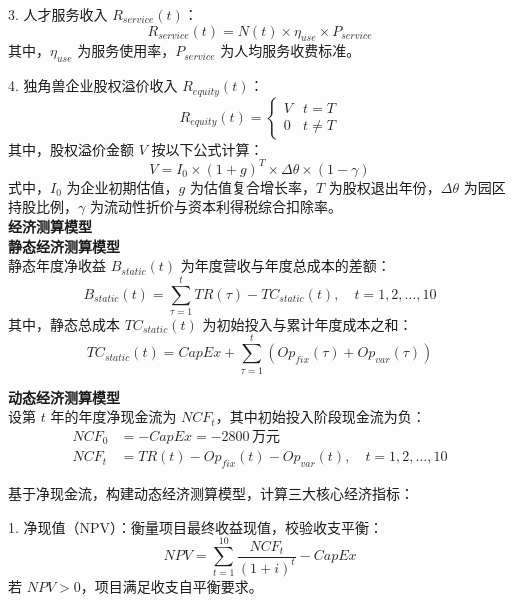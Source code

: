 \documentclass[12pt,a4paper]{article}
\begin{document}
3.  人才服务收入 $R_{service}(t)$：
    \begin{equation}
    R_{service}(t) = N(t) \times \eta_{use} \times P_{service}
    \end{equation}
    其中，$\eta_{use}$ 为服务使用率，$P_{service}$ 为人均服务收费标准。

4.  独角兽企业股权溢价收入 $R_{equity}(t)$：
    \begin{equation}
    R_{equity}(t) = 
    \begin{cases} 
    V & t=T \\
    0 & t \neq T
    \end{cases}
    \end{equation}
    其中，股权溢价金额 $V$ 按以下公式计算：
    \begin{equation}
    V = I_0 \times (1+g)^T \times \Delta\theta \times (1-\gamma)
    \end{equation}
    式中，$I_0$ 为企业初期估值，$g$ 为估值复合增长率，$T$ 为股权退出年份，$\Delta\theta$ 为园区持股比例，$\gamma$ 为流动性折价与资本利得税综合扣除率。\\
\vspace{1em}\textbf{经济测算模型}\\
\vspace{1em}\textbf{静态经济测算模型}\\
静态年度净收益 $B_{static}(t)$ 为年度营收与年度总成本的差额：
\begin{equation}
B_{static}(t) = \sum_{\tau=1}^{t} TR(\tau) - TC_{static}(t), \quad t=1,2,\dots,10
\end{equation}
其中，静态总成本 $TC_{static}(t)$ 为初始投入与累计年度成本之和：
\begin{equation}
TC_{static}(t) = CapEx + \sum_{\tau=1}^{t} \left( Op_{fix}(\tau) + Op_{var}(\tau) \right)
\end{equation}

\textbf{动态经济测算模型}\\
设第 $t$ 年的年度净现金流为 $NCF_t$，其中初始投入阶段现金流为负：
\begin{align*}
NCF_0 &= -CapEx = -2800\,\text{万元} \\
NCF_t &= TR(t) - Op_{fix}(t) - Op_{var}(t), \quad t=1,2,\dots,10
\end{align*}

基于净现金流，构建动态经济测算模型，计算三大核心经济指标：

1.  净现值（NPV）：衡量项目最终收益现值，校验收支平衡：
    \begin{equation}
    NPV = \sum_{t=1}^{10} \frac{NCF_t}{(1+i)^t} - CapEx
    \end{equation}
    若 $NPV>0$，项目满足收支自平衡要求。
\end{document}
